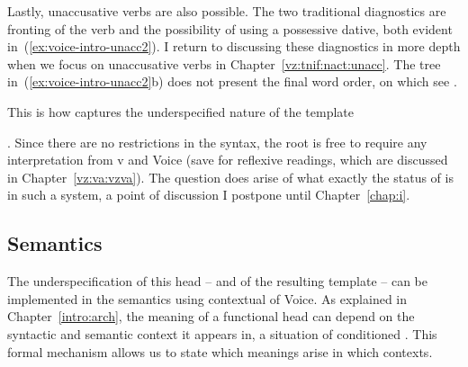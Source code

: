 \begin{exe}
\begin{xlist}
\begin{exe}
\begin{xlist}
\begin{exe}
\begin{xlist}
\begin{exe}
\begin{exe}
\begin{xlist}
\begin{exe}
\begin{xlist}
\begin{exe}
\begin{xlist}
\begin{exe}
\begin{xlist}
\begin{exe}
\begin{xlist}
\begin{exe}
\begin{xlist}
\begin{exe}
\begin{xlist}
\begin{exe}
\begin{xlist}
\begin{exe}
\begin{xlist}
\begin{exe}
\begin{xlist}
\begin{exe}
\begin{xlist}
\begin{exe}
\begin{xlist}
\begin{exe}
\begin{exe}
\begin{xlist}
\begin{exe}
\begin{xlist}
\begin{exe}
\begin{xlist}
Lastly, unaccusative verbs are also possible. The two traditional diagnostics are fronting of the verb and the possibility of using a possessive dative, both evident in~(\ref{ex:voice-intro-unacc2}). I return to discussing these diagnostics in more depth when we focus on unaccusative verbs in Chapter~\ref{vz:tnif:nact:unacc}. The tree in~(\ref{ex:voice-intro-unacc2}b) does not present the final word order, on which see \cite{preminger10}.
 \begin{exe}
 \ex \label{ex:voice-intro-unacc2} 
 \begin{xlist} 
	
 	 \z
\z 		

This is how  captures the underspecified nature of the template {\tkal. Since there are no restrictions in the syntax, the root is free to require any interpretation from v and Voice (save for reflexive readings, which are discussed in Chapter~\ref{vz:va:vzva}). The question does arise of what exactly the status of  is in such a system, a point of discussion I postpone until Chapter~\ref{chap:i}.

		
		\subsection{Semantics} \label{voice:voice:sem}
The underspecification of this head -- and of the resulting template -- can be implemented in the semantics using contextual  of Voice. As explained in Chapter~\ref{intro:arch}, the meaning of a functional head can depend on the syntactic and semantic context it appears in, a situation of conditioned . This formal mechanism allows us to state which meanings arise in which contexts.

}
\end{xlist}
\end{exe}
\end{xlist}
\end{exe}
\end{xlist}
\end{exe}
\end{xlist}
\end{exe}
\end{exe}
\end{xlist}
\end{exe}
\end{xlist}
\end{exe}
\end{xlist}
\end{exe}
\end{xlist}
\end{exe}
\end{xlist}
\end{exe}
\end{xlist}
\end{exe}
\end{xlist}
\end{exe}
\end{xlist}
\end{exe}
\end{xlist}
\end{exe}
\end{xlist}
\end{exe}
\end{xlist}
\end{exe}
\end{xlist}
\end{exe}
\end{exe}
\end{xlist}
\end{exe}
\end{xlist}
\end{exe}
\end{xlist}
\end{exe}
